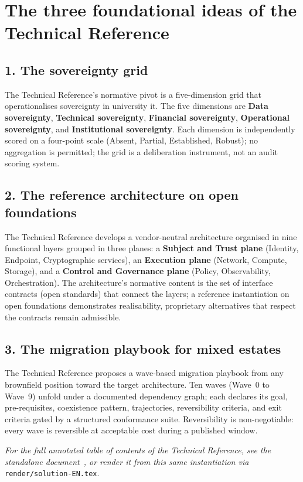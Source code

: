 \documentclass[11pt,a4paper,twoside]{book}
\newcommand{\genericroot}{../../..}
\newcommand{\keyword}[1]{\textbf{#1}}
\begin{document}
\medskip

\section*{The three foundational ideas of the Technical Reference}

\subsection*{1. The sovereignty grid}
The Technical Reference's normative pivot is a five-dimension grid that
operationalises sovereignty in university \gls{it}. The five dimensions are
\keyword{Data sovereignty}, \keyword{Technical sovereignty}, \keyword{Financial
sovereignty}, \keyword{Operational sovereignty}, and \keyword{Institutional
sovereignty}. Each dimension is independently scored on a four-point scale
(Absent, Partial, Established, Robust); no aggregation is permitted; the grid is
a deliberation instrument, not an audit scoring system.

\subsection*{2. The reference architecture on open foundations}
The Technical Reference develops a vendor-neutral architecture organised in nine
functional layers grouped in three planes: a \keyword{Subject and Trust plane}
(Identity, Endpoint, Cryptographic services), an \keyword{Execution plane}
(Network, Compute, Storage), and a \keyword{Control and Governance plane}
(Policy, Observability, Orchestration). The architecture's normative content is
the set of interface contracts (open standards) that connect the layers; a
reference instantiation on open foundations demonstrates realisability,
proprietary alternatives that respect the contracts remain admissible.

\subsection*{3. The migration playbook for mixed estates}
The Technical Reference proposes a wave-based migration playbook from any
brownfield position toward the target architecture. Ten waves (Wave~0 to Wave~9)
unfold under a documented dependency graph; each declares its goal,
pre-requisites, coexistence pattern, trajectories, reversibility criteria, and
exit criteria gated by a structured conformance suite. Reversibility is
non-negotiable: every wave is reversible at acceptable cost during a published
window.

\medskip
\noindent\emph{For the full annotated table of contents of the Technical
Reference, see the standalone document}~\cite{ng-tech-ref-2026}\emph{, or render
it from this same instantiation via} \texttt{render/solution-EN.tex}.

\backmatter

\printbibliography
\printabstractappendix
\end{document}
